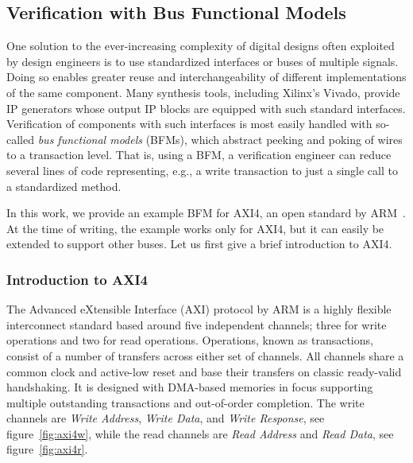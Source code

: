 \documentclass[conference]{IEEEtran}
\begin{document}
\subsection{Verification with Bus Functional Models}
One solution to the ever-increasing complexity of digital designs often exploited by design engineers is to use standardized interfaces or buses of multiple signals. Doing so enables greater reuse and interchangeability of different implementations of the same component. Many synthesis tools, including Xilinx's Vivado, provide IP generators whose output IP blocks are equipped with such standard interfaces. Verification of components with such interfaces is most easily handled with so-called \textit{bus functional models} (BFMs), which abstract peeking and poking of wires to a transaction level. That is, using a BFM, a verification engineer can reduce several lines of code representing, e.g., a write transaction to just a single call to a standardized method.

In this work, we provide an example BFM for AXI4, an open standard by ARM~\cite{axi4standard}. At the time of writing, the example works only for AXI4, but it can easily be extended to support other buses. Let us first give a brief introduction to AXI4.

\subsubsection{Introduction to AXI4}
The Advanced eXtensible Interface (AXI) protocol by ARM is a highly flexible interconnect standard based around five independent channels; three for write operations and two for read operations. Operations, known as transactions, consist of a number of transfers across either set of channels. All channels share a common clock and active-low reset and base their transfers on classic ready-valid handshaking. It is designed with DMA-based memories in focus supporting multiple outstanding transactions and out-of-order completion. The write channels are \textit{Write Address}, \textit{Write Data}, and \textit{Write Response}, see figure~\ref{fig:axi4w}, while the read channels are \textit{Read Address} and \textit{Read Data}, see figure~\ref{fig:axi4r}. 
\end{document}
